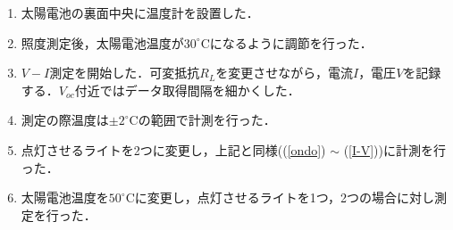 \begin{enumerate}[(1)]
	\item 太陽電池の裏面中央に温度計を設置した．
	\item 照度測定後，太陽電池温度が$30^{\circ}$Cになるように調節を行った．\label{ondo}
	\item $V-I$測定を開始した．可変抵抗$R_{L}$を変更させながら，電流$I$，電圧$V$を記録する．$V_{oc}$付近ではデータ取得間隔を細かくした．\label{I-V}
	\item 測定の際温度は$\pm 2^\circ$Cの範囲で計測を行った．
	\item 点灯させるライトを2つに変更し，上記と同様((\ref{ondo}) $\sim$ (\ref{I-V}))に計測を行った．
	\item 太陽電池温度を$50^{\circ}$Cに変更し，点灯させるライトを1つ，2つの場合に対し測定を行った．
\end{enumerate}

